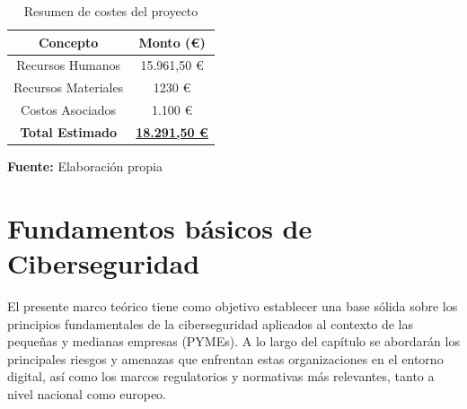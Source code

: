 \documentclass[a4paper, 10pt]{article}
\begin{document}
\begin{table}[H]
\caption{Resumen de costes del proyecto}
\centering
\renewcommand{\arraystretch}{1.5}
\begin{tabular}{|c|c|}
\hline
\textbf{Concepto} & \textbf{Monto (€)} \\ \hline
Recursos Humanos & 15.961,50 € \\ \hline
Recursos Materiales & 1230 € \\ \hline
Costos Asociados & 1.100 € \\ \hline
\textbf{Total Estimado} & \underline{\textbf{18.291,50 €}} \\ \hline
\end{tabular}
\begin{flushleft}\centering
    \footnotesize \textbf{Fuente:} Elaboración propia
\end{flushleft}   
\label{tab:resumen_costes}
\end{table}



\clearpage































\section{Fundamentos básicos de Ciberseguridad}


El presente marco teórico tiene como objetivo establecer una base sólida sobre los principios fundamentales de la ciberseguridad aplicados al contexto de las pequeñas y medianas empresas (PYMEs). A lo largo del capítulo se abordarán los principales riesgos y amenazas que enfrentan estas organizaciones en el entorno digital, así como los marcos regulatorios y normativas más relevantes, tanto a nivel nacional como europeo.

\par\vspace{0.5cm}
\end{document}
